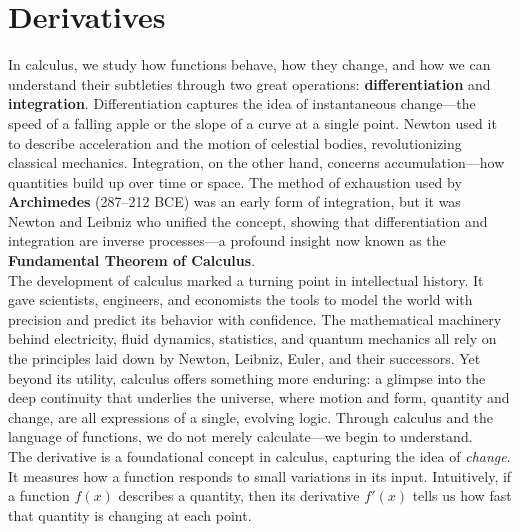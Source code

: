 \documentclass{book}
\begin{document}
\section{Derivatives}

In calculus, we study how functions behave, how they change, and how we can understand their subtleties through two great operations: \textbf{differentiation} and \textbf{integration}. Differentiation captures the idea of instantaneous change---the speed of a falling apple or the slope of a curve at a single point. Newton used it to describe acceleration and the motion of celestial bodies, revolutionizing classical mechanics. Integration, on the other hand, concerns accumulation---how quantities build up over time or space. The method of exhaustion used by \textbf{Archimedes} (287--212 BCE) was an early form of integration, but it was Newton and Leibniz who unified the concept, showing that differentiation and integration are inverse processes---a profound insight now known as the \textbf{Fundamental Theorem of Calculus}.\\

The development of calculus marked a turning point in intellectual history. It gave scientists, engineers, and economists the tools to model the world with precision and predict its behavior with confidence. The mathematical machinery behind electricity, fluid dynamics, statistics, and quantum mechanics all rely on the principles laid down by Newton, Leibniz, Euler, and their successors. Yet beyond its utility, calculus offers something more enduring: a glimpse into the deep continuity that underlies the universe, where motion and form, quantity and change, are all expressions of a single, evolving logic. Through calculus and the language of functions, we do not merely calculate---we begin to understand.\\

The derivative is a foundational concept in calculus, capturing the idea of \emph{change}. It measures how a function responds to small variations in its input. Intuitively, if a function \( f(x) \) describes a quantity, then its derivative \( f'(x) \) tells us how fast that quantity is changing at each point.
\end{document}
